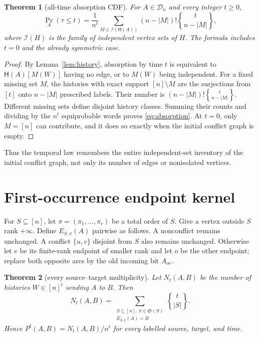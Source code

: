 \documentclass[a4paper,10pt]{amsart}
\newtheorem{theorem}{Theorem}[section]
\theoremstyle{remark}
\newcommand{\Dn}{\mathcal D_n}
\newcommand{\Conf}{\mathsf H}
\newcommand{\Stir}[2]{\genfrac\{\}{0pt}{}{#1}{#2}}
\begin{document}
\begin{theorem}[all-time absorption CDF]\label{thm:absorption}
For $A\in\Dn$ and every integer $t\geq0$,
\begin{equation}\label{eq:absorption}
 \Pr_A(\tau\leq t)=\frac1{n^t}
 \sum_{M\in\mathcal I(\Conf(A))}
 (n-|M|)!\Stir{t}{n-|M|},
\end{equation}
where $\mathcal I(H)$ is the family of independent vertex sets of $H$.
The formula includes $t=0$ and the already symmetric case.
\end{theorem}

\begin{proof}
By Lemma~\ref{lem:history}, absorption by time $t$ is equivalent to
$\Conf(A)[M(W)]$ having no edge, or to $M(W)$ being independent.  For a fixed
missing set $M$, the histories with exact support $[n]\setminus M$ are the
surjections from $[t]$ onto $n-|M|$ prescribed labels.  Their number is
$(n-|M|)!\Stir{t}{n-|M|}$.  Different missing sets define disjoint history
classes.  Summing their counts and dividing by the $n^t$ equiprobable words
proves \eqref{eq:absorption}.  At $t=0$, only $M=[n]$ can contribute, and it
does so exactly when the initial conflict graph is empty.
\end{proof}

Thus the temporal law remembers the entire independent-set inventory of the
initial conflict graph, not only its number of edges or nonisolated vertices.

\section{First-occurrence endpoint kernel}

For $S\subseteq[n]$, let $\pi=(\pi_1,\ldots,\pi_r)$ be a total order of $S$.
Give a vertex outside $S$ rank $+\infty$.  Define $E_{S,\pi}(A)$ pairwise as
follows.  A nonconflict remains unchanged.  A conflict $\{u,v\}$ disjoint
from $S$ also remains unchanged.  Otherwise let $e$ be its finite-rank
endpoint of smaller rank and let $o$ be the other endpoint; replace both
opposite arcs by the old incoming bit $A_{oe}$.

\begin{theorem}[every source--target multiplicity]\label{thm:endpoint}
Let $N_t(A,B)$ be the number of histories $W\in[n]^t$ sending $A$ to $B$.
Then
\begin{equation}\label{eq:endpoint}
 N_t(A,B)=
 \sum_{\substack{S\subseteq[n],\ \pi\in\mathfrak S(S)\\
                  E_{S,\pi}(A)=B}}
 \Stir{t}{|S|}.
\end{equation}
Hence $P^t(A,B)=N_t(A,B)/n^t$ for every labelled source, target, and time.
\end{theorem}
\end{document}
